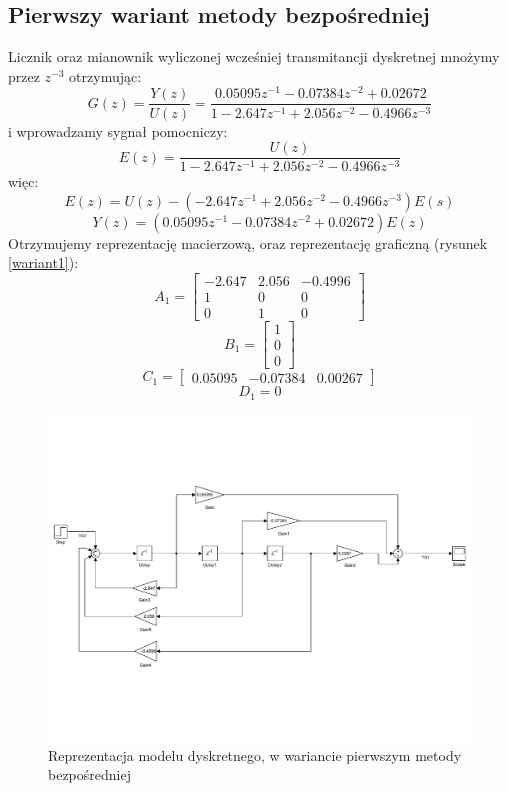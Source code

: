 \documentclass{article}
\begin{document}
\subsection{Pierwszy wariant metody bezpośredniej}
Licznik oraz mianownik wyliczonej wcześniej transmitancji dyskretnej mnożymy przez $z^{-3}$ otrzymując:
\[ G(z)= \frac{Y(z)}{U(z)}= \frac{0.05095 z^{-1} - 0.07384z^{-2} + 0.02672}{1 - 2.647z^{-1} + 2.056z^{-2} - 0.4966z^{-3}} \]
i wprowadzamy sygnał pomocniczy:
\[E(z) = \frac{U(z)}{1 - 2.647z^{-1} + 2.056z^{-2} - 0.4966z^{-3}}\]
więc:
\[E(z) = U(z)-(- 2.647z^{-1} + 2.056z^{-2} - 0.4966z^{-3})E(s)\]
\[Y(z) = (0.05095 z^{-1} - 0.07384z^{-2} + 0.02672)E(z) \]
Otrzymujemy reprezentację macierzową, oraz reprezentację graficzną (rysunek \ref{wariant1}):
\[A_1=\begin{bmatrix}
-2.647 & 2.056 & -0.4996 \\ 1 & 0 & 0 \\ 0 & 1 & 0
\end{bmatrix}\]
\[B_1=\begin{bmatrix}
1 \\ 0 \\ 0
\end{bmatrix}\]
\[C_1=\begin{bmatrix}
0.05095 & -0.07384 & 0.00267
\end{bmatrix}\]
\[D_1 = 0\]
\begin{figure}[h]
\centering
\includegraphics[width=0.8\linewidth]{wariant1}
\caption{Reprezentacja modelu dyskretnego, w wariancie pierwszym metody bezpośredniej}
\label{fig:wariant1}
\end{figure}
\end{document}

